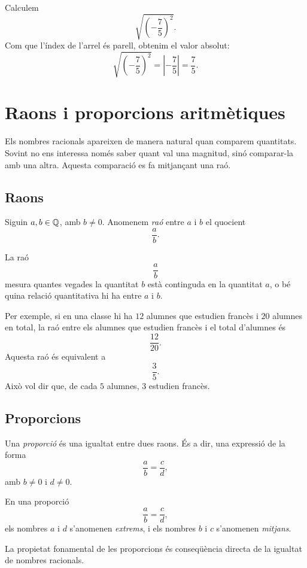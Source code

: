 \begin{exemple}
Calculem
\[
	\sqrt{\left(-\frac{7}{5}\right)^2}.
\]
Com que l'índex de l'arrel és parell, obtenim el valor absolut:
\[
	\sqrt{\left(-\frac{7}{5}\right)^2}
	=
	\left|-\frac{7}{5}\right|
	=
	\frac{7}{5}.
\]
\end{exemple}

\section{Raons i proporcions aritmètiques}

Els nombres racionals apareixen de manera natural quan comparem quantitats. Sovint no ens interessa només saber quant val una magnitud, sinó comparar-la amb una altra. Aquesta comparació es fa mitjançant una raó.

\subsection{Raons}

Siguin \(a,b\in\mathbb{Q}\), amb \(b\neq0\). Anomenem \emph{raó} entre \(a\) i \(b\) el quocient
\[
	\frac{a}{b}.
\]

La raó
\[
	\frac{a}{b}
\]
mesura quantes vegades la quantitat \(b\) està continguda en la quantitat \(a\), o bé quina relació quantitativa hi ha entre \(a\) i \(b\).

Per exemple, si en una classe hi ha \(12\) alumnes que estudien francès i \(20\) alumnes en total, la raó entre els alumnes que estudien francès i el total d'alumnes és
\[
	\frac{12}{20}.
\]
Aquesta raó és equivalent a
\[
	\frac{3}{5}.
\]
Això vol dir que, de cada \(5\) alumnes, \(3\) estudien francès.

\subsection{Proporcions}

\begin{definicio}
Una \emph{proporció} és una igualtat entre dues raons. És a dir, una expressió de la forma
\[
	\frac{a}{b}=\frac{c}{d},
\]
amb \(b\neq0\) i \(d\neq0\).
\end{definicio}

En una proporció
\[
	\frac{a}{b}=\frac{c}{d},
\]
els nombres \(a\) i \(d\) s'anomenen \emph{extrems}, i els nombres \(b\) i \(c\) s'anomenen \emph{mitjans}.

La propietat fonamental de les proporcions és conseqüència directa de la igualtat de nombres racionals.

